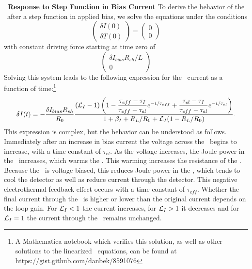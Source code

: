 \textbf{\TES\ Response to Step Function in Bias Current}
To derive the behavior of the \TES\ after a step function in applied bias, we solve the equations under the conditions
\begin{equation}
\begin{pmatrix} \delta I(0) \\ \delta T(0) \end{pmatrix} = \begin{pmatrix} 0 \\ 0 \end{pmatrix}
\end{equation}
with constant driving force starting at time zero of
\begin{equation}
\begin{pmatrix} \delta I_{bias} R_{sh} / L \\ 0 \end{pmatrix}
\end{equation}
Solving this system leads to the following expression for the \TES\ current as a function of time:\footnote{A Mathematica notebook which verifies this solution, as well as other solutions to the linearized \TES\ equations, can be found at https://gist.github.com/danbek/8591076}
\begin{equation}\label{eqn:bias-step-resp}
\delta I (t)
   = - \dfrac{\delta I_{bias} R_{sh}}{R_0} 
       \dfrac{(\mathcal{L}_I - 1)
             \left(1 - \dfrac{\tau_{eff} - \tau_I}{\tau_{eff} - \tau_{el}} e^{-t/\tau_{eff}}
                 	       + \dfrac{\tau_{el} - \tau_I}{\tau_{eff} - \tau_{el}} e^{-t/\tau_{el}} \right)}
            {1 + \beta_I + R_L/R_0 + \mathcal{L}_I(1 - R_L/R_0)}
       .
\end{equation}
This expression is complex, but the behavior can be understood as follows.
Immediately after an increase in bias current the voltage across the \TES\ begins to increase, with a time constant of $\tau_{el}$.
As the voltage increases, the Joule power in the \TES\ increases, which warms the \TES.
This warming increases the resistance of the \TES.
Because the \TES\ is voltage-biased, this reduces Joule power in the \TES, which tends to cool the detector as well as reduce current through the detector.
This negative electrothermal feedback effect occurs with a time constant of $\tau_{eff}$.
Whether the final current through the \TES\ is higher or lower than the original current depends on the loop gain.
For $\mathcal{L}_I < 1$ the current increases, for $\mathcal{L}_I > 1$ it decreases and for $\mathcal{L}_I = 1$ the current through the \TES\ remains unchanged.

